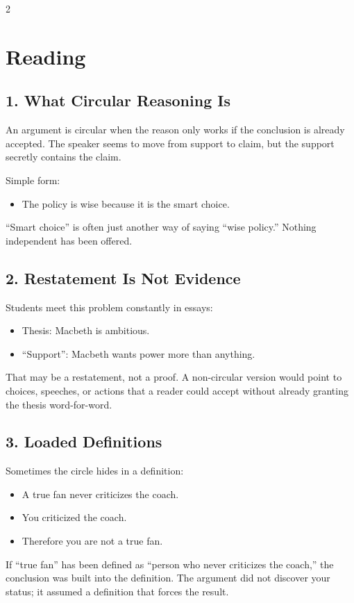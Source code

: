 \documentclass[12pt]{article}
\begin{document}
\begin{multicols}{2}
\section*{Reading}

\subsection*{1. What Circular Reasoning Is}
An argument is circular when the reason only works if the conclusion is already accepted. The speaker seems to move from support to claim, but the support secretly contains the claim.

Simple form:
\begin{itemize}[leftmargin=*]
\item The policy is wise because it is the smart choice.
\end{itemize}
``Smart choice'' is often just another way of saying ``wise policy.'' Nothing independent has been offered.

\subsection*{2. Restatement Is Not Evidence}
Students meet this problem constantly in essays:
\begin{itemize}[leftmargin=*]
\item Thesis: Macbeth is ambitious.
\item ``Support'': Macbeth wants power more than anything.
\end{itemize}
That may be a restatement, not a proof. A non-circular version would point to choices, speeches, or actions that a reader could accept without already granting the thesis word-for-word.

\subsection*{3. Loaded Definitions}
Sometimes the circle hides in a definition:
\begin{itemize}[leftmargin=*]
\item A true fan never criticizes the coach.
\item You criticized the coach.
\item Therefore you are not a true fan.
\end{itemize}
If ``true fan'' has been defined as ``person who never criticizes the coach,'' the conclusion was built into the definition. The argument did not discover your status; it assumed a definition that forces the result.


\end{multicols}
\end{document}
